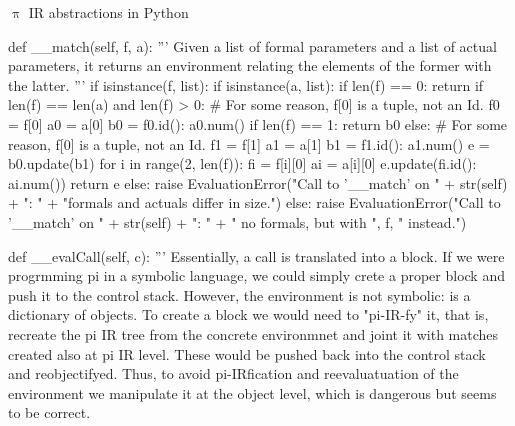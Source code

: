 \documentclass{beamer}
\begin{document}
\begin{frame}{{\color{red}$\uppi$ IR} abstractions in Python}
\begin{python}
    def __match(self, f, a):
        '''
        Given a list of formal parameters and a list of actual parameters,
        it returns an environment relating the elements of the former with the latter.
        '''
        if isinstance(f, list):
            if isinstance(a, list):
                if len(f) == 0:
                    return {}
                if len(f) == len(a) and len(f) > 0:
                # For some reason, f[0] is a tuple, not an Id.
                    f0 = f[0]
                    a0 = a[0]
                    b0 = {f0.id(): a0.num()}
                if len(f) == 1:
                    return b0
                else:
                    # For some reason, f[0] is a tuple, not an Id.
                    f1 = f[1]
                    a1 = a[1]
                    b1 = {f1.id(): a1.num()}
                    e = b0.update(b1)
                    for i in range(2, len(f)):
                        fi = f[i][0]
                        ai = a[i][0]
                        e.update({fi.id(): ai.num()})
                    return e
            else:
                raise EvaluationError("Call to '__match' on " + str(self) + ": " + "formals and actuals differ in size.")
        else:
            raise EvaluationError("Call to '__match' on " + str(self) + ": " + " no formals, but with ", f, " instead.")

    def __evalCall(self, c):
        '''
        Essentially, a call is translated into a block.
        If we were progrmming pi in a symbolic language,
        we could simply crete a proper block and push it to the control stack.
        However, the environment is not symbolic: is a dictionary of objects.
        To create a block we would need to "pi-IR-fy" it, that is, recreate the
        pi IR tree from the concrete environmnet and joint it with matches created
        also at pi IR level. These would be pushed back into the control stack and
        reobjectifyed. Thus, to avoid pi-IRfication and reevaluatuation of the
        environment we manipulate it at the object level, which is dangerous but
        seems to be correct.
        

\end{python}
\end{frame}
\end{document}
